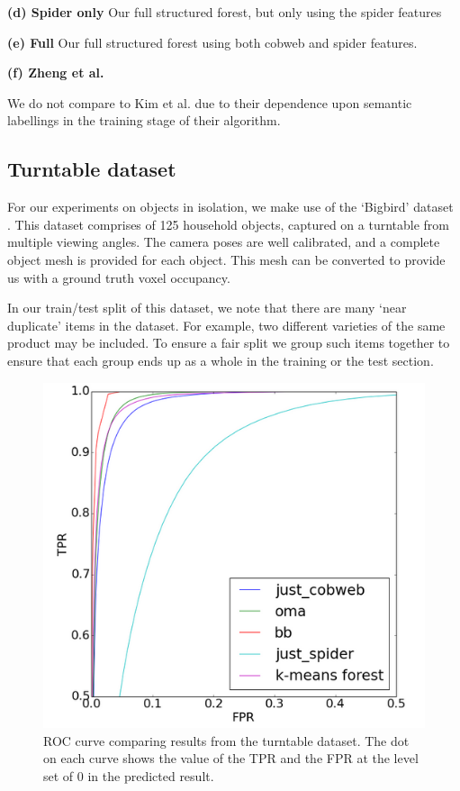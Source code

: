 \documentclass[10pt,twocolumn,letterpaper]{article}
\makeatletter
\newcommand*{\ea}{et al.\@\xspace}
\makeatother
\begin{document}
\noindent \textbf{(d) Spider only} Our full structured forest, but only using the spider features

\noindent \textbf{(e) Full}  Our full structured forest using both cobweb and spider features.

\noindent \textbf{(f) Zheng \ea \cite{zheng-cvpr-2013}}




We do not compare to Kim \ea \cite{kim-iccv-2013} due to their dependence upon semantic labellings in the training stage of their algorithm.


\subsection{Turntable dataset}

For our experiments on objects in isolation, we make use of the `Bigbird' dataset \cite{singh-icra-2014}. 
This dataset comprises of 125 household objects, captured on a turntable from multiple viewing angles.
The camera poses are well calibrated, and a complete object mesh is provided for each object.
This mesh can be converted to provide us with a ground truth voxel occupancy.

In our train/test split of this dataset, we note that there are many `near duplicate' items in the dataset.
For example, two different varieties of the same product may be included.
To ensure a fair split we group such items together to ensure that each group ends up as a whole in the training or the test section.

\begin{figure}[bt]
  \centering 
  \includegraphics[width=0.9\columnwidth]{roc_curve}
  \caption{ROC curve comparing results from the turntable dataset. 
  The dot on each curve shows the value of the TPR and the FPR at the level set of 0 in the predicted result.}
  \label{fig:bigbird_roc}
\end{figure}
\end{document}
